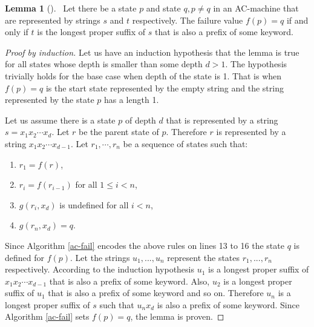 \documentclass[english,twoside,censored,csm,algorithms-track-2020]{HYthesisML}
\theoremstyle{plain}
\theoremstyle{definition}
\newtheorem{lemma}[theorem]{Lemma}
\begin{document}
\begin{lemma}[]~\label{lem-overlap}
  Let there be a state $p$ and state $q, p\neq q$ in an AC-machine that are represented by strings
  $s$ and $t$ respectively. The failure value $f(p) = q$ if and only if $t$ is the longest proper suffix
  of $s$ that is also a prefix of some keyword.
\end{lemma}
\begin{proof}[Proof by induction]
  Let us have an induction hypothesis that the lemma is true for all states whose depth is smaller
  than some depth $d > 1$. The hypothesis trivially holds for the base case when
  depth of the state is 1. That is when $f(p) = q$ is the start state represented by the empty
  string and the string represented by the state $p$ has a length 1.
  
  Let us assume there is a state $p$ of depth $d$ that is represented by a string
  $s=x_1x_2\cdots x_d$. Let $r$ be the parent state of $p$. Therefore $r$ is represented by a
  string $x_1x_2\cdots x_{d-1}$. Let $r_1,\cdots ,r_n$ be a sequence of states such that:

  \begin{enumerate}
  \item $r_1 = f(r)$,
  \item $r_i = f(r_{i-1})$ for all $ 1 \leq i < n$,
  \item $g(r_i, x_d)$ is undefined for all $i < n$,
  \item $g(r_n, x_d) = q$.
  \end{enumerate}

  Since Algorithm \ref{ac-fail} encodes the above rules on lines 13 to 16 the state $q$ is defined
  for $f(p)$. Let the strings $u_1,...,u_n$ represent the states $r_1,...,r_n$ respectively.
  According to the induction hypothesis $u_1$ is a longest proper suffix of $x_1x_2\cdots x_{d-1}$
  that is also a prefix of some keyword. Also, $u_2$ is a longest proper suffix of $u_1$ that is also
  a prefix of some keyword and so on. Therefore $u_n$ is a longest proper suffix of $s$ such that
  $u_nx_d$ is also a prefix of some keyword. Since Algorithm \ref{ac-fail} sets $f(p) = q$,
  the lemma is proven.
  
\end{proof}  
\end{document}
